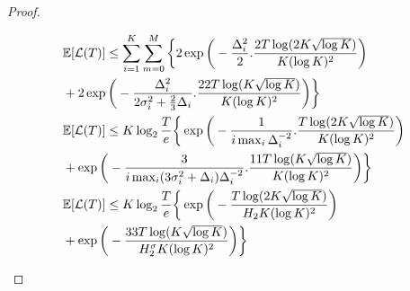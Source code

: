 \begin{proof}
\begin{small}
\begin{align*}
&\mathbb{E}[\mathcal{L}(T)] \leq \sum_{i=1}^{K}\sum_{m=0}^{M}\bigg\lbrace 2\exp\bigg( -\frac{\Delta_{i}^{2}}{2}.\frac{2T\log (2 K\sqrt{\log K})}{K (\log K)^2}\bigg)\\
& + 2\exp\bigg(- \frac{\Delta_{i}^{2}}{2\sigma_{i}^{2}+ \frac{2}{3}\Delta_i}.\frac{22T\log ( K\sqrt{\log K})}{ K(\log K)^2} \bigg)\bigg\rbrace\\
&\mathbb{E}[\mathcal{L}(T)] \leq K\log_2\frac{T}{e}\bigg\lbrace\exp\bigg( -\frac{1}{i\max_{i}\Delta_{i}^{-2}}.\frac{T\log (2 K\sqrt{\log K})}{K (\log K)^2}\bigg)\\
& + \exp\bigg(- \frac{3}{i\max_i(3\sigma_{i}^{2}+ \Delta_i)\Delta_{i}^{-2}}.\frac{11T\log ( K\sqrt{\log K})}{ K(\log K)^2} \bigg)\bigg\rbrace\\
&\mathbb{E}[\mathcal{L}(T)] \leq K\log_2\frac{T}{e}\bigg\lbrace\exp\bigg( -\frac{T\log (2 K\sqrt{\log K})}{H_2 K (\log K)^2}\bigg)\\
& + \exp\bigg(- \frac{33T\log ( K\sqrt{\log K})}{H_{2}^{\sigma} K(\log K)^2} \bigg)\bigg\rbrace\\
\end{align*}
\end{small}


%
%

\end{proof}

